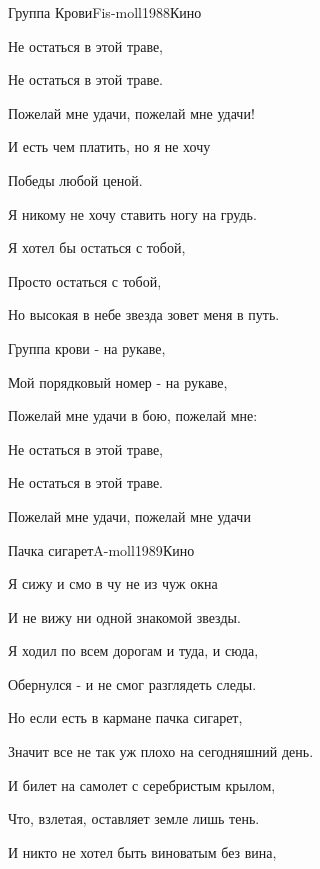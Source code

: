 \documentclass[a4paper,draft]{book}
\begin{document}
\begin{otherlanguage}{russian}
\begin{song}{Группа Крови}{Fis-moll}{1988}{Кино}{}{}
\begin{SBChorus}
	Не остаться в этой траве,

	Не остаться в этой траве.

	Пожелай мне удачи, пожелай мне удачи!
\end{SBChorus}

\begin{SBVerse}
	И есть чем платить, но я не хочу

	Победы любой ценой.

	Я никому не хочу ставить ногу на грудь.

	Я хотел бы остаться с тобой,

	Просто остаться с тобой,

	Но высокая в небе звезда зовет меня в путь.
\end{SBVerse}

\begin{SBChorus}
	Группа крови - на рукаве,

	Мой порядковый номер - на рукаве,

	Пожелай мне удачи в бою, пожелай мне:

	Не остаться в этой траве,

	Не остаться в этой траве.

	Пожелай мне удачи, пожелай мне удачи
\end{SBChorus}
\end{song}

\begin{song}{Пачка сигарет}{A-moll}{1989}{Кино}{}{}

\begin{SBVerse}
	Я сижу и смо в чу не из чуж окна

	И не вижу ни одной знакомой звезды.

	Я ходил по всем дорогам и туда, и сюда,

	Обернулся - и не смог разглядеть следы.
\end{SBVerse}

\begin{SBChorus}
	Но если есть в кармане пачка сигарет,

	Значит все не так уж плохо на сегодняшний день.

	И билет на самолет с серебристым крылом,

	Что, взлетая, оставляет земле лишь тень.
\end{SBChorus}

\begin{SBVerse}
	И никто не хотел быть виноватым без вина,


\end{SBVerse}
\end{song}
\end{otherlanguage}
\end{document}
